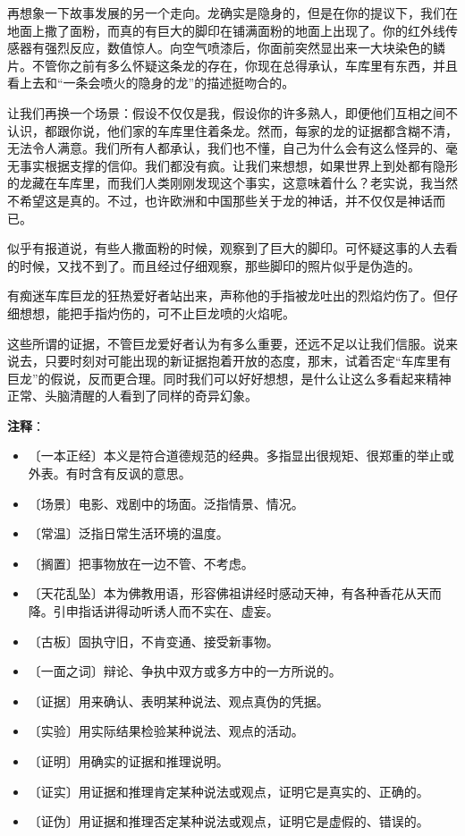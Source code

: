 \documentclass[12pt,UTF-8,openany]{ctexbook}
\begin{document}
\begin{normalsize}
    再想象一下故事发展的另一个走向。龙确实是隐身的，但是在你的提议下，我们在地面上撒了面粉，而真的有巨大的脚印在铺满面粉的地面上出现了。你的红外线传感器有强烈反应，数值惊人。向空气喷漆后，你面前突然显出来一大块染色的鳞片。不管你之前有多么怀疑这条龙的存在，你现在总得承认，车库里有东西，并且看上去和“一条会喷火的隐身的龙”的描述挺吻合的。
    
    让我们再换一个场景：假设不仅仅是我，假设你的许多熟人，即便他们互相之间不认识，都跟你说，他们家的车库里住着条龙。然而，每家的龙的证据都含糊不清，无法令人满意。我们所有人都承认，我们也不懂，自己为什么会有这么怪异的、毫无事实根据支撑的信仰。我们都没有疯。让我们来想想，如果世界上到处都有隐形的龙藏在车库里，而我们人类刚刚发现这个事实，这意味着什么？老实说，我当然不希望这是真的。不过，也许欧洲和中国那些关于龙的神话，并不仅仅是神话而已。
    
    似乎有报道说，有些人撒面粉的时候，观察到了巨大的脚印。可怀疑这事的人去看的时候，又找不到了。而且经过仔细观察，那些脚印的照片似乎是伪造的。
    
    有痴迷车库巨龙的狂热爱好者站出来，声称他的手指被龙吐出的烈焰灼伤了。但仔细想想，能把手指灼伤的，可不止巨龙喷的火焰呢。
    
    这些所谓的证据，不管巨龙爱好者认为有多么重要，还远不足以让我们信服。说来说去，只要时刻对可能出现的新证据抱着开放的态度，那末，试着否定“车库里有巨龙”的假说，反而更合理。同时我们可以好好想想，是什么让这么多看起来精神正常、头脑清醒的人看到了同样的奇异幻象。
    
\end{normalsize}


\newpage

\textbf{注释}：

\vspace{-1em}

\begin{itemize}
    \setlength\itemsep{-0.2em}
    \item 〔一本正经〕本义是符合道德规范的经典。多指显出很规矩、很郑重的举止或外表。有时含有反讽的意思。
    \item 〔场景〕电影、戏剧中的场面。泛指情景、情况。
    \item 〔常温〕泛指日常生活环境的温度。
    \item 〔搁置〕把事物放在一边不管、不考虑。
    \item 〔天花乱坠〕本为佛教用语，形容佛祖讲经时感动天神，有各种香花从天而降。引申指话讲得动听诱人而不实在、虚妄。
    \item 〔古板〕固执守旧，不肯变通、接受新事物。
    \item 〔一面之词〕辩论、争执中双方或多方中的一方所说的。
    \item 〔证据〕用来确认、表明某种说法、观点真伪的凭据。
    \item 〔实验〕用实际结果检验某种说法、观点的活动。
    \item 〔证明〕用确实的证据和推理说明。
    \item 〔证实〕用证据和推理肯定某种说法或观点，证明它是真实的、正确的。
    \item 〔证伪〕用证据和推理否定某种说法或观点，证明它是虚假的、错误的。
\end{itemize}
\end{document}
